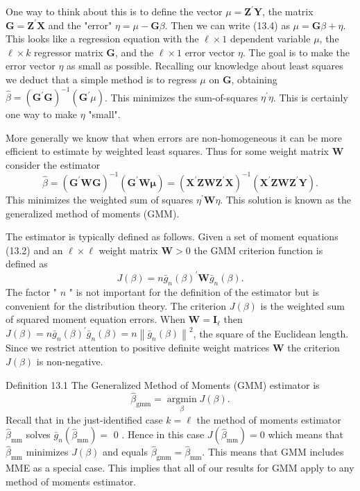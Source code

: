 \documentclass[10pt]{article}
\begin{document}
One way to think about this is to define the vector $\mu=\boldsymbol{Z}^{\prime} \boldsymbol{Y}$, the matrix $\boldsymbol{G}=\boldsymbol{Z}^{\prime} \boldsymbol{X}$ and the "error" $\eta=\mu-\boldsymbol{G} \beta$. Then we can write (13.4) as $\mu=\boldsymbol{G} \beta+\eta$. This looks like a regression equation with the $\ell \times 1$ dependent variable $\mu$, the $\ell \times k$ regressor matrix $\boldsymbol{G}$, and the $\ell \times 1$ error vector $\eta$. The goal is to make the error vector $\eta$ as small as possible. Recalling our knowledge about least squares we deduct that a simple method is to regress $\mu$ on $\boldsymbol{G}$, obtaining $\widehat{\beta}=\left(\boldsymbol{G}^{\prime} \boldsymbol{G}\right)^{-1}\left(\boldsymbol{G}^{\prime} \mu\right)$. This minimizes the sum-of-squares $\eta^{\prime} \eta$. This is certainly one way to make $\eta$ "small".

More generally we know that when errors are non-homogeneous it can be more efficient to estimate by weighted least squares. Thus for some weight matrix $\boldsymbol{W}$ consider the estimator
$$
\widehat{\beta}=\left(\boldsymbol{G}^{\prime} \boldsymbol{W} \boldsymbol{G}\right)^{-1}\left(\boldsymbol{G}^{\prime} \boldsymbol{W} \boldsymbol{\mu}\right)=\left(\boldsymbol{X}^{\prime} \boldsymbol{Z} \boldsymbol{W} \boldsymbol{Z}^{\prime} \boldsymbol{X}\right)^{-1}\left(\boldsymbol{X}^{\prime} \boldsymbol{Z} \boldsymbol{W} \boldsymbol{Z}^{\prime} \boldsymbol{Y}\right) .
$$
This minimizes the weighted sum of squares $\eta^{\prime} \boldsymbol{W} \eta$. This solution is known as the generalized method of moments (GMM).

The estimator is typically defined as follows. Given a set of moment equations (13.2) and an $\ell \times \ell$ weight matrix $\boldsymbol{W}>0$ the GMM criterion function is defined as
$$
J(\beta)=n \bar{g}_{n}(\beta)^{\prime} \boldsymbol{W} \bar{g}_{n}(\beta) .
$$
The factor " $n$ " is not important for the definition of the estimator but is convenient for the distribution theory. The criterion $J(\beta)$ is the weighted sum of squared moment equation errors. When $\boldsymbol{W}=\boldsymbol{I}_{\ell}$ then $J(\beta)=n \bar{g}_{n}(\beta)^{\prime} \bar{g}_{n}(\beta)=n\left\|\bar{g}_{n}(\beta)\right\|^{2}$, the square of the Euclidean length. Since we restrict attention to positive definite weight matrices $\boldsymbol{W}$ the criterion $J(\beta)$ is non-negative.

Definition 13.1 The Generalized Method of Moments (GMM) estimator is
$$
\widehat{\beta}_{\mathrm{gmm}}=\underset{\beta}{\operatorname{argmin}} J(\beta) .
$$
Recall that in the just-identified case $k=\ell$ the method of moments estimator $\widehat{\beta}_{\mathrm{mm}}$ solves $\bar{g}_{n}\left(\widehat{\beta}_{\mathrm{mm}}\right)=$ 0 . Hence in this case $J\left(\widehat{\beta}_{\mathrm{mm}}\right)=0$ which means that $\widehat{\beta}_{\mathrm{mm}}$ minimizes $J(\beta)$ and equals $\widehat{\beta}_{\mathrm{gmm}}=\widehat{\beta}_{\mathrm{mm}}$. This means that GMM includes MME as a special case. This implies that all of our results for GMM apply to any method of moments estimator.
\end{document}
